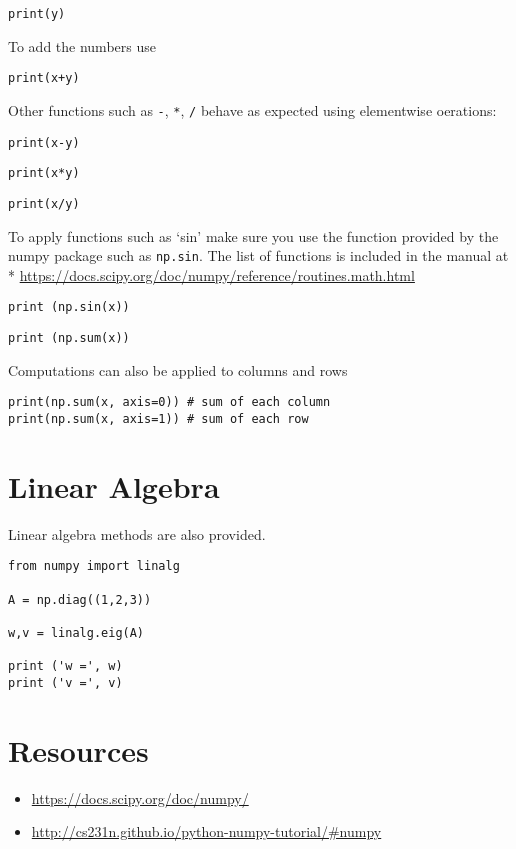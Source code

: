 \begin{lstlisting}
print(y)
\end{lstlisting}

To add the numbers use

\begin{lstlisting}
print(x+y)
\end{lstlisting}

Other functions such as \texttt{-}, \texttt{*}, \texttt{/} behave as
expected using elementwise oerations:

\begin{lstlisting}
print(x-y)
\end{lstlisting}

\begin{lstlisting}
print(x*y)
\end{lstlisting}

\begin{lstlisting}
print(x/y)
\end{lstlisting}

To apply functions such as `sin' make sure you use the function provided
by the numpy package such as \texttt{np.sin}. The list of functions is
included in the manual at *
\url{https://docs.scipy.org/doc/numpy/reference/routines.math.html}

\begin{lstlisting}
print (np.sin(x))
\end{lstlisting}

\begin{lstlisting}
print (np.sum(x))
\end{lstlisting}

Computations can also be applied to columns and rows

\begin{lstlisting}
print(np.sum(x, axis=0)) # sum of each column
print(np.sum(x, axis=1)) # sum of each row
\end{lstlisting}

\section{Linear Algebra}

Linear algebra methods are also provided.

\begin{lstlisting}
from numpy import linalg 

A = np.diag((1,2,3))

w,v = linalg.eig(A)

print ('w =', w)
print ('v =', v)
\end{lstlisting}

\section{Resources}

\begin{itemize}
\item \url{https://docs.scipy.org/doc/numpy/}
\item \url{http://cs231n.github.io/python-numpy-tutorial/\#numpy}
\end{itemize}
